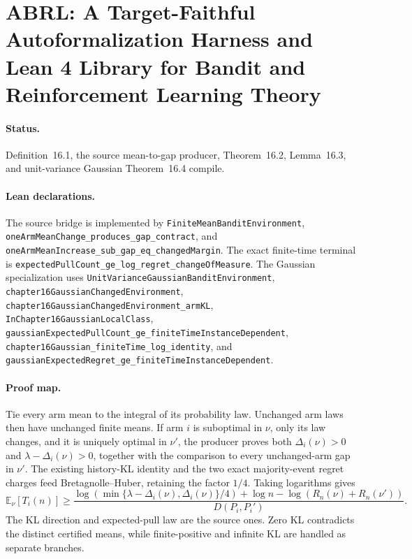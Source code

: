 \section{ABRL: A Target-Faithful Autoformalization Harness and Lean 4 Library for Bandit and Reinforcement Learning Theory}

\paragraph{Status.}
Definition~16.1, the source mean-to-gap producer, Theorem~16.2,
Lemma~16.3, and unit-variance Gaussian Theorem~16.4 compile.

\paragraph{Lean declarations.}
The source bridge is implemented by
\texttt{FiniteMeanBanditEnvironment},
\texttt{oneArmMeanChange\_produces\_gap\_contract}, and
\texttt{oneArmMeanIncrease\_sub\_gap\_eq\_changedMargin}.
The exact finite-time terminal is
\texttt{expectedPullCount\_ge\_log\_regret\_changeOfMeasure}.
The Gaussian specialization uses
\texttt{UnitVarianceGaussianBanditEnvironment},
\texttt{chapter16GaussianChangedEnvironment},
\texttt{chapter16GaussianChangedEnvironment\_armKL},
\texttt{InChapter16GaussianLocalClass},
\texttt{gaussianExpectedPullCount\_ge\_finiteTimeInstanceDependent},
\texttt{chapter16Gaussian\_finiteTime\_log\_identity}, and
\texttt{gaussianExpectedRegret\_ge\_finiteTimeInstanceDependent}.

\paragraph{Proof map.}
Tie every arm mean to the integral of its probability law. Unchanged arm laws
then have unchanged finite means. If arm $i$ is suboptimal in $\nu$, only its
law changes, and it is uniquely optimal in $\nu'$, the producer proves both
$\Delta_i(\nu)>0$ and
$\lambda-\Delta_i(\nu)>0$, together with the comparison to every unchanged-arm
gap in $\nu'$. The existing history-KL identity and the two exact
majority-event regret charges feed Bretagnolle--Huber, retaining the factor
$1/4$. Taking logarithms gives
\[
  \mathbb E_\nu[T_i(n)] \ge
  \frac{\log(\min\{\lambda-\Delta_i(\nu),\Delta_i(\nu)\}/4)
    +\log n-\log(R_n(\nu)+R_n(\nu'))}
       {D(P_i,P_i')}.
\]
The KL direction and expected-pull law are the source ones. Zero KL contradicts
the distinct certified means, while finite-positive and infinite KL are
handled as separate branches.

